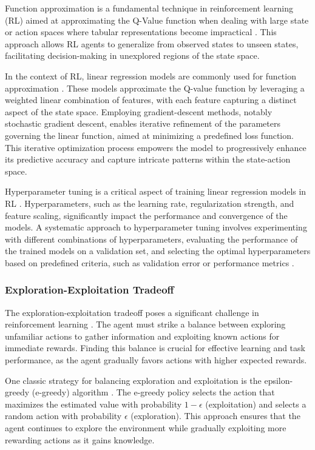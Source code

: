 Function approximation is a fundamental technique in reinforcement learning (RL) aimed at approximating the Q-Value function when dealing with large state or action spaces where tabular representations become impractical \cite{russel2020ai}. This approach allows RL agents to generalize from observed states to unseen states, facilitating decision-making in unexplored regions of the state space.

In the context of RL, linear regression models are commonly used for function approximation \cite{sutton2018reinforcement}.  These models approximate the Q-value function by leveraging a weighted linear combination of features, with each feature capturing a distinct aspect of the state space. Employing gradient-descent methods, notably stochastic gradient descent, enables iterative refinement of the parameters governing the linear function, aimed at minimizing a predefined loss function. This iterative optimization process empowers the model to progressively enhance its predictive accuracy and capture intricate patterns within the state-action space.

Hyperparameter tuning is a critical aspect of training linear regression models in RL \cite{bergstra2012random}. Hyperparameters, such as the learning rate, regularization strength, and feature scaling, significantly impact the performance and convergence of the models. A systematic approach to hyperparameter tuning involves experimenting with different combinations of hyperparameters, evaluating the performance of the trained models on a validation set, and selecting the optimal hyperparameters based on predefined criteria, such as validation error or performance metrics \cite{russel2020ai}.

\subsubsection{Exploration-Exploitation Tradeoff}

The exploration-exploitation tradeoff poses a significant challenge in reinforcement learning \cite{sutton2018reinforcement}. The agent must strike a balance between exploring unfamiliar actions to gather information and exploiting known actions for immediate rewards. Finding this balance is crucial for effective learning and task performance, as the agent gradually favors actions with higher expected rewards.

One classic strategy for balancing exploration and exploitation is the epsilon-greedy (e-greedy) algorithm \cite{sutton2018reinforcement}. The e-greedy policy selects the action that maximizes the estimated value with probability $1 - \epsilon$ (exploitation) and selects a random action with probability $\epsilon$ (exploration). This approach ensures that the agent continues to explore the environment while gradually exploiting more rewarding actions as it gains knowledge.

